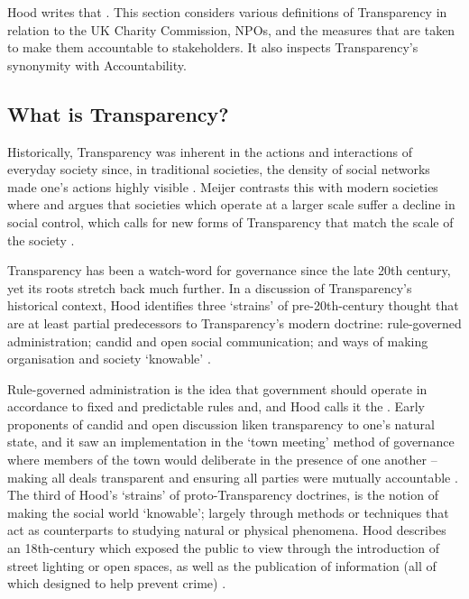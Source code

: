 %
Hood writes that  \cite{hood_transparency_2006-1}. This section considers various definitions of Transparency in relation to the UK Charity Commission, NPOs, and the measures that are taken to make them accountable to stakeholders. It also inspects Transparency's synonymity with Accountability.

\subsection{What is Transparency?}
Historically, Transparency was inherent in the actions and interactions of everyday society since, in traditional societies, the density of social networks made one's actions highly visible \cite{meijer_understanding_2009}. Meijer contrasts this with modern societies where  and argues that societies which operate at a larger scale suffer a decline in social control, which calls for new forms of Transparency that match the scale of the society \cite{meijer_understanding_2009}.


Transparency has been a watch-word for governance since the late 20th century, yet its roots stretch back much further. In a discussion of Transparency's historical context, Hood identifies three `strains' of pre-20th-century thought that are at least partial predecessors to Transparency's modern doctrine: rule-governed administration; candid and open social communication; and ways of making organisation and society `knowable'  \cite{hood_transparency_2006-1}.

Rule-governed administration is the idea that government should operate in accordance to fixed and predictable rules and, and Hood calls it the  \cite{hood_transparency_2006-1}. Early proponents of candid and open discussion liken transparency to one's natural state, and it saw an implementation in the `town meeting' method of governance where members of the town would deliberate in the presence of one another -- making all deals transparent and ensuring all parties were mutually accountable \cite{hood_transparency_2006-1}. The third of Hood's `strains' of proto-Transparency doctrines, is the notion of making the social world `knowable'; largely through methods or techniques that act as counterparts to studying natural or physical phenomena. Hood describes an 18th-century  which exposed the public to view through the introduction of street lighting or open spaces, as well as the publication of information (all of which designed to help prevent crime) \cite{hood_transparency_2006-1}.


